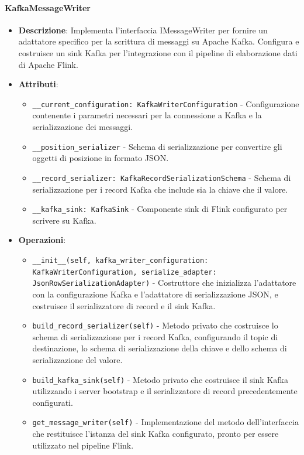 \documentclass[10pt]{article}
\begin{document}
    \paragraph{KafkaMessageWriter}
    \begin{itemize} 
    \item \textbf{Descrizione}: Implementa l'interfaccia IMessageWriter per fornire un adattatore specifico per la scrittura di messaggi su Apache Kafka. Configura e costruisce un sink Kafka per l'integrazione con il pipeline di elaborazione dati di Apache Flink.
    \item \textbf{Attributi}:
    \begin{itemize}
        \item \texttt{\_\_current\_configuration: KafkaWriterConfiguration} - Configurazione contenente i parametri necessari per la connessione a Kafka e la serializzazione dei messaggi.
        \item \texttt{\_\_position\_serializer} - Schema di serializzazione per convertire gli oggetti di posizione in formato JSON.
        \item \texttt{\_\_record\_serializer: KafkaRecordSerializationSchema} - Schema di serializzazione per i record Kafka che include sia la chiave che il valore.
        \item \texttt{\_\_kafka\_sink: KafkaSink} - Componente sink di Flink configurato per scrivere su Kafka.
    \end{itemize}
    
    \item \textbf{Operazioni}:
    \begin{itemize}
        \item \texttt{\_\_init\_\_(self, kafka\_writer\_configuration: KafkaWriterConfiguration, serialize\_adapter: JsonRowSerializationAdapter)} - Costruttore che inizializza l'adattatore con la configurazione Kafka e l'adattatore di serializzazione JSON, e costruisce il serializzatore di record e il sink Kafka.
        
        \item \texttt{build\_record\_serializer(self)} - Metodo privato che costruisce lo schema di serializzazione per i record Kafka, configurando il topic di destinazione, lo schema di serializzazione della chiave e dello schema di serializzazione del valore.
        
        \item \texttt{build\_kafka\_sink(self)} - Metodo privato che costruisce il sink Kafka utilizzando i server bootstrap e il serializzatore di record precedentemente configurati.
        
        \item \texttt{get\_message\_writer(self)} - Implementazione del metodo dell'interfaccia che restituisce l'istanza del sink Kafka configurato, pronto per essere utilizzato nel pipeline Flink.
    \end{itemize}
    \end{itemize}
\end{document}
